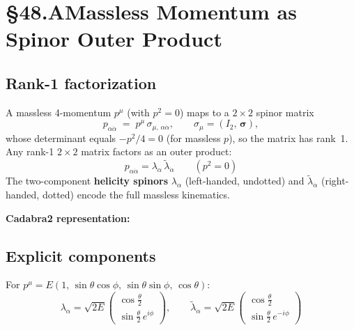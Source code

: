 \section{§48.A\quad Massless Momentum as Spinor Outer Product}

\subsection{Rank-1 factorization}

A massless 4-momentum $p^\mu$ (with $p^2=0$) maps to a $2\times2$ spinor matrix
\begin{equation}
  p_{\alpha\dot\alpha} \;=\; p^\mu\,\sigma_{\mu,\,\alpha\dot\alpha},
  \qquad
  \sigma_\mu = (I_2,\,\boldsymbol{\sigma}),
  \tag{48.1}
\end{equation}
whose determinant equals $-p^2/4=0$ (for massless $p$), so the matrix has rank~1.
Any rank-1 $2\times2$ matrix factors as an outer product:
\begin{equation}
  \boxed{
    p_{\alpha\dot\alpha} = \lambda_\alpha\,\tilde\lambda_{\dot\alpha}
  }
  \qquad (p^2 = 0)
  \tag{48.2}
\end{equation}
The two-component \textbf{helicity spinors} $\lambda_\alpha$ (left-handed, undotted)
and $\tilde\lambda_{\dot\alpha}$ (right-handed, dotted) encode the full massless kinematics.

\medskip
\textbf{Cadabra2 representation:} \cdbexpr{\lambda_{\alpha} \tilde{\lambda}_{\dot{\alpha}}}

\subsection{Explicit components}

For $p^\mu = E(1,\,\sin\theta\cos\phi,\,\sin\theta\sin\phi,\,\cos\theta)$:
\begin{equation}
  \lambda_\alpha = \sqrt{2E}\begin{pmatrix}\cos\tfrac\theta2 \\ \sin\tfrac\theta2\,e^{i\phi}\end{pmatrix},
  \qquad
  \tilde\lambda_{\dot\alpha} = \sqrt{2E}\begin{pmatrix}\cos\tfrac\theta2 \\ \sin\tfrac\theta2\,e^{-i\phi}\end{pmatrix}
  \tag{48.3}
\end{equation}

